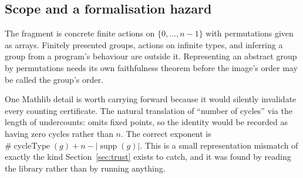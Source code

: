 \subsection{Scope and a formalisation hazard}

The fragment is concrete finite actions on $\{0,\ldots,n-1\}$ with permutations
given as arrays. Finitely presented groups, actions on infinite types, and
inferring a group from a program's behaviour are outside it. Representing an
abstract group by permutations needs its own faithfulness theorem before the
image's order may be called the group's order.

One Mathlib detail is worth carrying forward because it would silently
invalidate every counting certificate. The natural translation of ``number of
cycles'' via the length of  undercounts: 
omits fixed points, so the identity would be recorded as having zero cycles
rather than $n$. The correct exponent is
$\#\operatorname{cycleType}(g)+n-|\operatorname{supp}(g)|$. This is a small
representation mismatch of exactly the kind Section~\ref{sec:trust} exists to
catch, and it was found by reading the library rather than by running anything.
